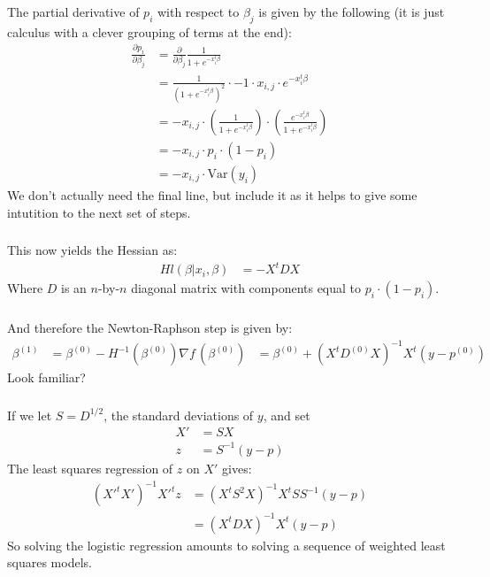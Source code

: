 \begin{frame}[fragile] \frametitle{}

The partial derivative of $p_i$ with respect to $\beta_j$ is
given by the following (it is just calculus with a clever
grouping of terms at the end):
\begin{align*}
\frac{\partial p_i}{\partial \beta_j}
&= \frac{\partial}{\partial \beta_j} \frac{1}{1+e^{-x_i^t \beta}} \\
&= \frac{1}{(1+e^{-x_i^t \beta})^2} \cdot -1 \cdot x_{i,j} \cdot e^{-x_i^t \beta} \\
&= -x_{i,j} \cdot \left(\frac{1}{1+e^{-x_i^t \beta}} \right) \cdot \left(\frac{e^{-x_i^t \beta}}{1+e^{-x_i^t \beta}} \right) \\
&= -x_{i,j} \cdot p_i \cdot (1 - p_i) \\
&= -x_{i,j} \cdot \text{Var}(y_i)
\end{align*}
\pause We don't actually need the final line, but include it as it
helps to give some intutition to the next set of steps.

\end{frame}


\begin{frame}[fragile] \frametitle{}

This now yields the Hessian as:
\begin{align*}
H l(\beta | x_i, \beta) &= - X^t D X
\end{align*}
Where $D$ is an $n$-by-$n$ diagonal matrix with components equal
to $p_i\cdot(1-p_i)$.

\end{frame}

\begin{frame}[fragile] \frametitle{}

And therefore the Newton-Raphson step is given by:
\begin{align*}
\beta^{(1)} &= \beta^{(0)} - H^{-1}(\beta^{(0)}) \nabla f\,(\beta^{(0)})
&= \beta^{(0)} + (X^t D^{(0)} X)^{-1} X^t (y - p^{(0)})
\end{align*}
\pause Look familiar?

\end{frame}

\begin{frame}[fragile] \frametitle{}

If we let $S = D^{1/2}$, the standard deviations of $y$, and set
\begin{align*}
X' &= SX \\
z &= S^{-1} (y - p)
\end{align*}
\pause The least squares regression of $z$ on $X'$ gives:
\begin{align*}
(X'^t X')^{-1} X'^t z &= (X^t S^2 X)^{-1} X^t S S^{-1} (y - p)\\
&= (X^t D X)^{-1} X^t (y - p)
\end{align*}
So solving the logistic regression amounts to solving a sequence of
weighted least squares models.

\end{frame}

